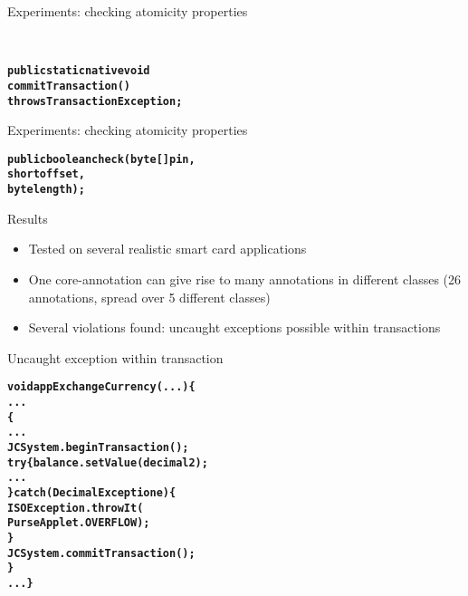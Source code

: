 \documentclass[final,nocolorBG,a4,marieke,nototal,pdf, accumulate,slideColor]{prosper}
\begin{document}
\begin{slide}{Experiments: checking atomicity properties}

\smallskip\\

\begin{alltt}
\textbf{
public static native void 
   commitTransaction() 
         throws TransactionException;}
\end{alltt}
\end{slide}

\begin{slide}{Experiments: checking atomicity properties}
\smallskip\\

\begin{alltt}
\textbf{
public boolean check(byte[] pin, 
                     short offset, 
                     byte length);}
\end{alltt}
\end{slide}

\begin{slide}{Results}
\begin{itemize}
\item Tested on several realistic smart card applications
\item One core-annotation can give rise to many annotations in
different classes (26 annotations, spread over 5 different classes)
\item Several violations found: uncaught exceptions possible within
transactions 
\end{itemize}
\end{slide}

\begin{slide}{Uncaught exception within transaction}
\begin{alltt}
\textbf{void appExchangeCurrency(...) \{
   ...
    \{
      ...
      JCSystem.beginTransaction();	
      try \{balance.setValue(decimal2);
            ...
      \} catch (DecimalException e) \{
         ISOException.throwIt(
              PurseApplet.OVERFLOW);
      \}
      JCSystem.commitTransaction();
   \}
   ...\}}
\end{alltt}
\end{slide}
\end{document}
